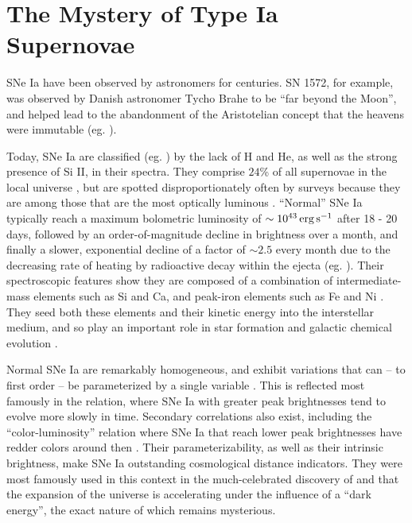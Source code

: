 \section{The Mystery of Type Ia Supernovae}
\label{sec:c1_mysteryofsneia}


SNe Ia have been observed by astronomers for centuries.  SN 1572, for example, was observed by Danish astronomer Tycho Brahe to be ``far beyond the Moon'', and helped lead to the abandonment of the Aristotelian concept that the heavens were immutable (eg. \citealt{clars77}).


Today, SNe Ia are classified (eg. \citealt{fili97, li+11}) by the lack of H and He, as well as the strong presence of Si II, in their spectra.  They comprise $24$\% of all supernovae in the local universe \citep{li+11}, but are spotted disproportionately often by surveys because they are among those that are the most optically luminous \citep{howe11}.  ``Normal'' SNe Ia \citep{bran98, bran+06} typically reach a maximum bolometric luminosity of $\sim10^{43}\,\ergpsec$ after 18 - 20 days, followed by an order-of-magnitude decline in brightness over a month, and finally a slower, exponential decline of a factor of $\sim2.5$ every month due to the decreasing rate of heating by radioactive decay within the ejecta (eg. \citealt{fili97, hill+13}).  Their spectroscopic features show they are composed of a combination of intermediate-mass elements such as Si and Ca, and peak-iron elements such as Fe and Ni \citep{arne96, fili97}.  They seed both these elements and their kinetic energy into the interstellar medium, and so play an important role in star formation and galactic chemical evolution \citep{maozmn14}.


Normal SNe Ia are remarkably homogeneous, and exhibit variations that can -- to first order -- be parameterized by a single variable \citep{hilln00, howe11}.  This is reflected most famously in the \cite{phil93} relation, where SNe Ia with greater peak brightnesses tend to evolve more slowly in time.  Secondary correlations also exist, including the ``color-luminosity'' relation where SNe Ia that reach lower peak brightnesses have redder colors around then \citep{ries+96}.  Their parameterizability, as well as their intrinsic brightness, make SNe Ia outstanding cosmological distance indicators.  They were most famously used in this context in the much-celebrated discovery of \cite{ries+98} and \cite{perl+99} that the expansion of the universe is accelerating under the influence of a ``dark energy'', the exact nature of which remains mysterious.

